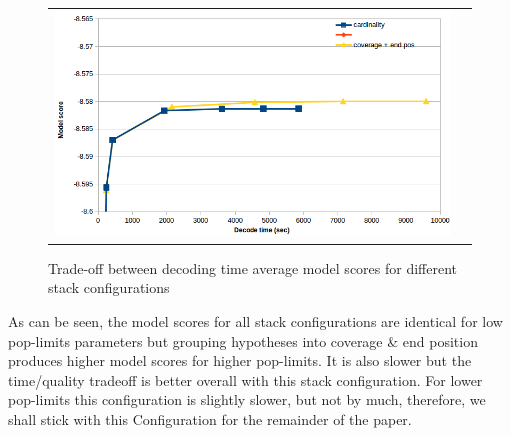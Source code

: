 \documentclass[11pt]{article}
\begin{document}
\begin{figure}[h]
\centering
\begin{tabular}{cc}
{\includegraphics[scale=0.4]{stack-configuration.png}} 
\end{tabular}
\caption{Trade-off between decoding time average model scores for different stack configurations}
\label{fig:stack-configuration}
\end{figure} 
As can be seen, the model scores for all stack configurations are identical for low pop-limits parameters but grouping hypotheses into coverage \& end position produces higher model scores for higher pop-limits. It is also slower but the time/quality tradeoff is better overall with this stack configuration. For lower pop-limits this configuration is slightly slower, but not by much, therefore, we shall stick with this Configuration for the remainder of the paper.
\end{document}
